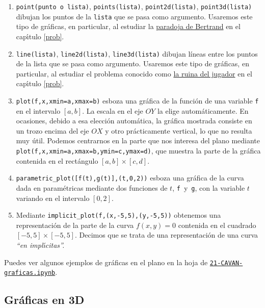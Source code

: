 \begin{enumerate}\itemsep=-1pt
	\item  \lstinline|point(punto o lista)|, \lstinline|points(lista)|, %
	\lstinline|point2d(lista)|, \lstinline|point3d(lista)| %
	dibujan los puntos de la \lstinline|lista| que se pasa como
	argumento. Usaremos este tipo de gráficas, en particular,  al estudiar la
	\hyperref[bertrand]{paradoja de Bertrand} en el cap\'{\i}tulo \ref{prob}. 
	
	\item  \lstinline|line(lista)|, \lstinline|line2d(lista)|, %
	\lstinline|line3d(lista)| dibujan líneas entre los puntos de la lista que se
	pasa como
	argumento. Usaremos este tipo de gráficas, en particular,  al estudiar el
	problema conocido como \hyperref[]{la ruina del jugador} en el cap\'{\i}tulo
	\ref{prob}.
	
	\item \lstinline|plot(f,x,xmin=a,xmax=b)|  esboza una gráfica de la función de una
	variable  %
	\lstinline|f| en el intervalo $[a,b]$. La escala en el eje $OY$ la elige {\sage} autom\'aticamente. En ocasiones, debido a esa elecci\'on autom\'atica,  la gr\'afica mostrada consiste en un trozo encima del eje $OX$ y otro pr\'acticamente vertical, lo que no resulta muy \'util. Podemos centrarnos en la parte que nos interesa del plano mediante 
	\lstinline|plot(f,x,xmin=a,xmax=b,ymin=c,ymax=d)|, que muestra la parte de la gr\'afica contenida en el rect\'angulo $[a,b]\times [c,d].$
	
		\item \lstinline|parametric_plot([f(t),g(t)],(t,0,2))|  esboza una gráfica de la
	curva dada en param\'etricas mediante  dos funciones de $t$,    %
	\lstinline|f|~y~\lstinline|g|,  con la variable $t$ variando en el intervalo
	$[0,2]$.
	
	\item Mediante \lstinline|implicit_plot(f,(x,-5,5),(y,-5,5))| obtenemos una
	representaci\'on de la parte de  la curva $f(x,y)=0$ contenida en el
	cuadrado $[-5,5]\times [-5,5]$. Decimos que se trata de una representaci\'on de
	una curva {\itshape ``en impl\'{\i}citas''.}
	
\end{enumerate}

Puedes ver algunos ejemplos de gr\'aficas en el  plano  en la hoja de {\sage}
\href{http://localhost:8888/notebooks/CAVAN/21-CAVAN-graficas.ipynb}{\tt 21-CAVAN-graficas.ipynb}.

\subsection{Gr\'aficas en 3D}

